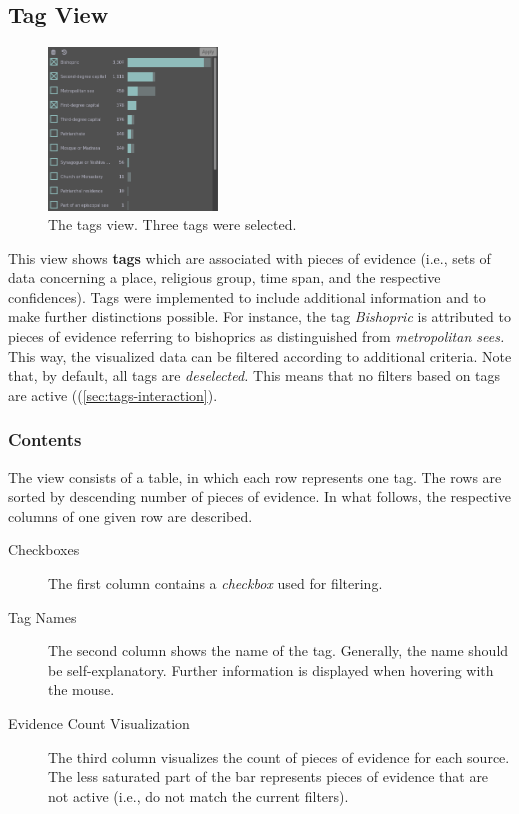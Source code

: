 \subsection{Tag View}
\label{sec:tags}

\begin{figure}[tb]
  \centering
  \includegraphics[width=0.4\textwidth]{../src/assets/visualization-documentation/tags.png}
  \caption{
    The tags view.
    Three tags were selected.
  }
  \label{fig:tags}
\end{figure}

This view shows \textbf{tags} which are associated with pieces of evidence (i.e., sets of data concerning a place, religious group, time span, and the respective confidences).
Tags were implemented to include additional information and to make further distinctions possible.
For instance, the tag \emph{Bishopric} is attributed to pieces of evidence referring to bishoprics as distinguished from \emph{metropolitan sees.}
This way, the visualized data can be filtered according to additional criteria.
Note that, by default, all tags are \emph{deselected.}
This means that no filters based on tags are active ((\cref{sec:tags-interaction}).


\subsubsection{Contents}

The view consists of a table, in which each row represents one tag.
The rows are sorted by descending number of pieces of evidence.
In what follows, the respective columns of one given row are described.

\begin{description}
  \item[Checkboxes]
    The first column contains a \emph{checkbox} used for filtering.

  \item[Tag Names]
    The second column shows the name of the tag.
    Generally, the name should be self-explanatory.
    Further information is displayed when hovering with the mouse.

  \item[Evidence Count Visualization]
    The third column visualizes the count of pieces of evidence for each source.
    The less saturated part of the bar represents pieces of evidence that are not active (i.e., do not match the current filters).
\end{description}

